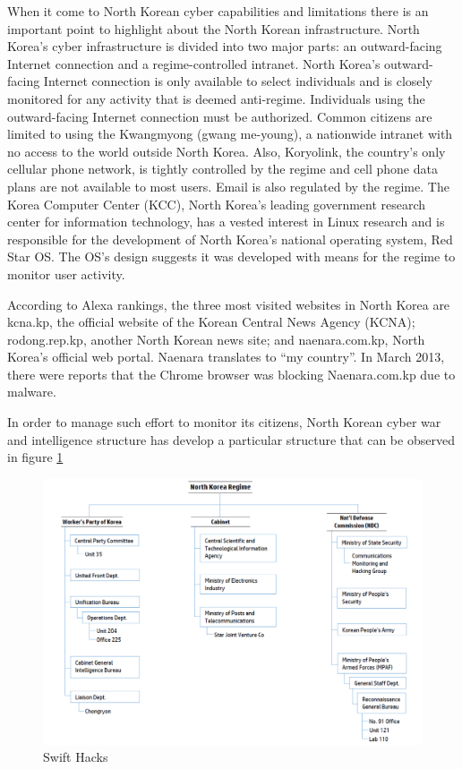 \documentclass[12pt]{article}
\begin{document}
        When it come to North Korean cyber capabilities and limitations there is an important point to highlight about the North Korean infrastructure. North Korea’s cyber infrastructure is divided into two major parts: an outward-facing Internet connection and a regime-controlled intranet. North Korea’s outward-facing Internet connection is only available to select individuals and is closely monitored for any activity that is deemed anti-regime. Individuals using the outward-facing Internet connection must be authorized. Common citizens are limited to using the Kwangmyong (gwang me-young), a nationwide intranet with no access to the world outside North Korea. Also, Koryolink, the country’s only cellular phone network, is tightly controlled by the regime and cell phone data plans are not available to most users. Email is also regulated by the regime. The Korea Computer Center (KCC), North Korea’s leading government research center for information technology, has a vested interest in Linux research and is responsible for the development of North Korea’s national operating system, Red Star OS. The OS’s design suggests it was developed with means for the regime to monitor user activity. 
        
        According to Alexa rankings, the three most visited websites in North Korea are kcna.kp, the official website of the Korean Central News Agency (KCNA); rodong.rep.kp, another North Korean news site; and naenara.com.kp, North Korea’s official web portal. Naenara translates to “my country”. In March 2013, there were reports that the Chrome browser was blocking Naenara.com.kp due to malware.
        
        In order to manage such effort to monitor its citizens, North Korean cyber war and intelligence structure has develop a particular structure that can be observed in figure \ref{fig:structure}
        
        \begin{figure}[H]
        \centering
        \includegraphics[width=\textwidth,cfbox=red 0.1mm 0.1mm]{figures/struttura.png}
        \caption{Swift Hacks}
        \label{fig:structure}
        \end{figure}
        
\end{document}
